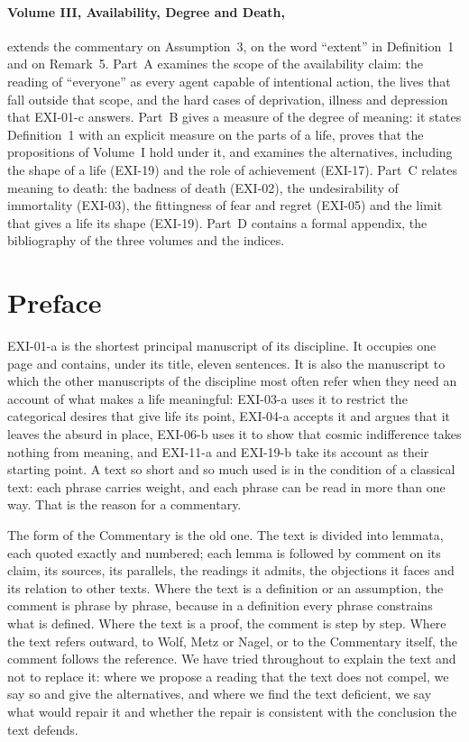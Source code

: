 \paragraph{Volume III, Availability, Degree and Death,} extends the commentary on Assumption~3, on the word \enquote{extent} in Definition~1 and on Remark~5. Part~A examines the scope of the availability claim: the reading of \enquote{everyone} as every agent capable of intentional action, the lives that fall outside that scope, and the hard cases of deprivation, illness and depression that EXI-01-c answers. Part~B gives a measure of the degree of meaning: it states Definition~1 with an explicit measure on the parts of a life, proves that the propositions of Volume~I hold under it, and examines the alternatives, including the shape of a life (EXI-19) and the role of achievement (EXI-17). Part~C relates meaning to death: the badness of death (EXI-02), the undesirability of immortality (EXI-03), the fittingness of fear and regret (EXI-05) and the limit that gives a life its shape (EXI-19). Part~D contains a formal appendix, the bibliography of the three volumes and the indices.

\section*{Preface}

EXI-01-a is the shortest principal manuscript of its discipline. It occupies one page and contains, under its title, eleven sentences. It is also the manuscript to which the other manuscripts of the discipline most often refer when they need an account of what makes a life meaningful: EXI-03-a uses it to restrict the categorical desires that give life its point, EXI-04-a accepts it and argues that it leaves the absurd in place, EXI-06-b uses it to show that cosmic indifference takes nothing from meaning, and EXI-11-a and EXI-19-b take its account as their starting point. A text so short and so much used is in the condition of a classical text: each phrase carries weight, and each phrase can be read in more than one way. That is the reason for a commentary.

The form of the Commentary is the old one. The text is divided into lemmata, each quoted exactly and numbered; each lemma is followed by comment on its claim, its sources, its parallels, the readings it admits, the objections it faces and its relation to other texts. Where the text is a definition or an assumption, the comment is phrase by phrase, because in a definition every phrase constrains what is defined. Where the text is a proof, the comment is step by step. Where the text refers outward, to Wolf, Metz or Nagel, or to the Commentary itself, the comment follows the reference. We have tried throughout to explain the text and not to replace it: where we propose a reading that the text does not compel, we say so and give the alternatives, and where we find the text deficient, we say what would repair it and whether the repair is consistent with the conclusion the text defends.

